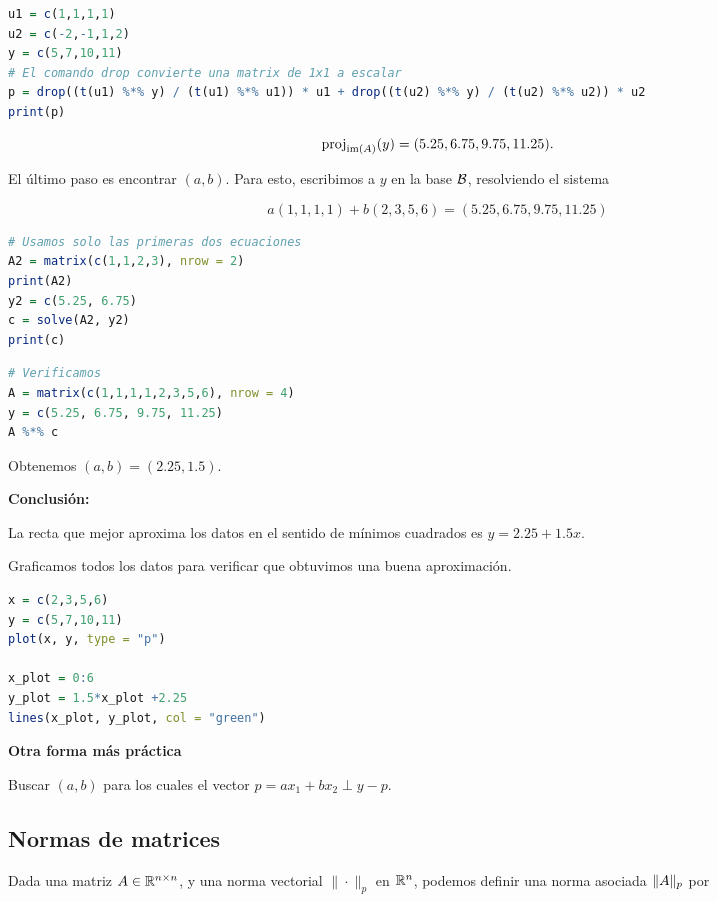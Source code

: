 \begin{aplicacion}
\begin{lstlisting}[language=R]
u1 = c(1,1,1,1)
u2 = c(-2,-1,1,2)
y = c(5,7,10,11)
# El comando drop convierte una matrix de 1x1 a escalar
p = drop((t(u1) %*% y) / (t(u1) %*% u1)) * u1 + drop((t(u2) %*% y) / (t(u2) %*% u2)) * u2
print(p)
\end{lstlisting}

$$
\operatorname{proj}_{\operatorname{im}(A)}(y) =  (5.25, 6.75, 9.75, 11.25).
$$

El último paso es encontrar $(a,b)$. Para esto, escribimos a $y$ en la base $\mathcal B$, resolviendo el sistema

$$
a(1,1,1,1) + b (2,3,5,6) = (5.25, 6.75, 9.75, 11.25)
$$

\begin{lstlisting}[language=R]
# Usamos solo las primeras dos ecuaciones
A2 = matrix(c(1,1,2,3), nrow = 2)
print(A2)
y2 = c(5.25, 6.75)
c = solve(A2, y2)
print(c)
\end{lstlisting}


\begin{lstlisting}[language=R]
# Verificamos
A = matrix(c(1,1,1,1,2,3,5,6), nrow = 4)
y = c(5.25, 6.75, 9.75, 11.25)
A %*% c
\end{lstlisting}


Obtenemos $(a, b) = (2.25 , 1.5)$.

\textbf{Conclusión:}

La recta que mejor aproxima los datos en el sentido de mínimos cuadrados es $y = 2.25 + 1.5 x$.

Graficamos todos los datos para verificar que obtuvimos una buena aproximación.

\begin{lstlisting}[language=R]
x = c(2,3,5,6)
y = c(5,7,10,11)
plot(x, y, type = "p")

x_plot = 0:6
y_plot = 1.5*x_plot +2.25
lines(x_plot, y_plot, col = "green")
\end{lstlisting}


\textbf{Otra forma más práctica}

Buscar $(a,b)$ para los cuales el vector $p = a x_1 + b x_2 \perp y-p$.

\end{aplicacion}


\subsection{Normas de matrices}

Dada una matriz $\Ab \in \R^{n \times n}$, y una norma vectorial $\|\cdot\|_p$ en $\mathbb R^n$, podemos definir una norma asociada $\|\Ab\|_p$ por

